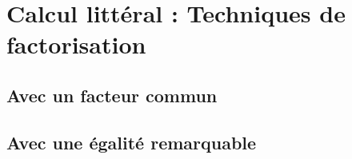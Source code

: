 \section{Calcul litt\'eral : Techniques de factorisation}
\subsection{Avec un facteur commun}


\subsection{Avec une égalité remarquable}

